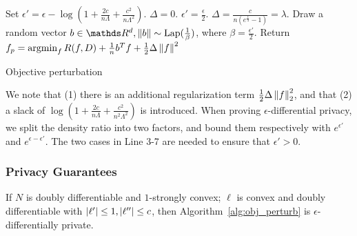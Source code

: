 \documentclass{article} %
\begin{document}
\begin{algorithm}[htb]
\begin{algorithmic}[1]
    \State Set $\epsilon' = \epsilon - \log{(1 + \frac{2c}{n\Lambda} + \frac{c^2}{n\Lambda^2})}$.
	\State $\Delta = 0$.
    \Else
	\State $\epsilon' = \frac{\epsilon}{2}$.
	\State $\Delta = \frac{c}{n(e^{\frac{\epsilon}{4}} - 1)} = \lambda$.
    \EndIf
    \State Draw a random vector $b\in \R^d, \norm{b}\sim \text{Lap}(\frac{1}{\beta})$, where $\beta = \frac{\epsilon'}{2}$.
    \State Return $f_{p} = \operatorname*{argmin}_f R(f, D) + \frac{1}{n} b^T f + \frac{1}{2}\Delta\left\lVert f\right\rVert^2 $
   \EndFunction
\end{algorithmic}
\caption{Objective perturbation}\label{alg:obj_perturb}
\end{algorithm}

We note that (1) there is an additional regularization term $\frac{1}{2}\Delta \left\lVert f\right\rVert_2^2$, and that
(2) a slack of $\log{(1 + \frac{2c}{n\Lambda} + \frac{c^2}{n^2\Lambda^2})}$ is introduced. When proving $\epsilon$-differential privacy, we split the density ratio into two factors, and bound them respectively with $e^{\epsilon'}$ and $e^{\epsilon - \epsilon'}$. The two cases in Line 3-7 are needed to ensure that $\epsilon' > 0$.

\subsubsection{Privacy Guarantees}
\begin{theorem}
If $N$ is doubly differentiable and $1$-strongly convex; $\ell$ is convex and doubly differentiable with $\left\lvert\ell'\right\rvert \le 1, \left\lvert\ell''\right\rvert \le c$, then Algorithm~\ref{alg:obj_perturb} is $\epsilon$-differentially private.
\end{theorem}
\end{document}
